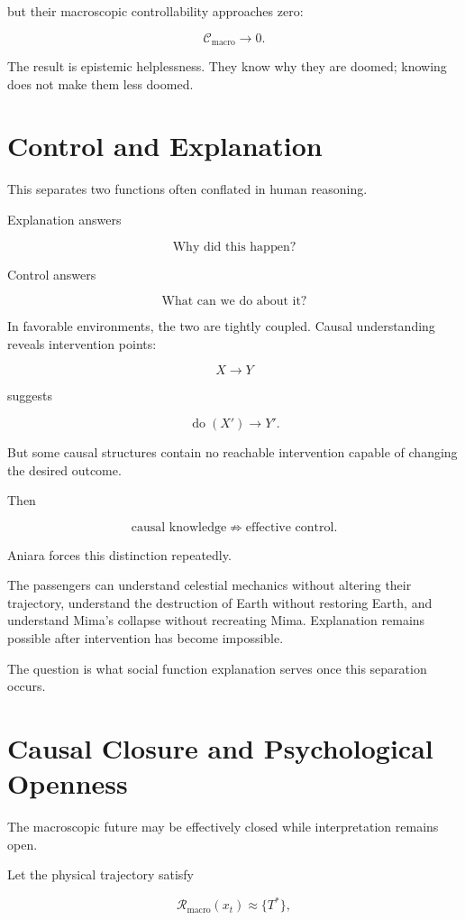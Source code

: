 \documentclass[11pt,oneside]{book}
\theoremstyle{definition}
\theoremstyle{remark}
\newcommand{\R}{\mathcal{R}}
\begin{document}
but their macroscopic controllability approaches zero:

\[
\mathcal C_{\mathrm{macro}}\rightarrow0.
\]

The result is epistemic helplessness. They know why they are doomed; knowing does not make them less doomed.

\section{Control and Explanation}

This separates two functions often conflated in human reasoning.

Explanation answers

\[
\text{Why did this happen?}
\]

Control answers

\[
\text{What can we do about it?}
\]

In favorable environments, the two are tightly coupled. Causal understanding reveals intervention points:

\[
X\rightarrow Y
\]

suggests

\[
\operatorname{do}(X')\rightarrow Y'.
\]

But some causal structures contain no reachable intervention capable of changing the desired outcome.

Then

\[
\text{causal knowledge}
\not\Rightarrow
\text{effective control}.
\]

Aniara forces this distinction repeatedly.

The passengers can understand celestial mechanics without altering their trajectory, understand the destruction of Earth without restoring Earth, and understand Mima's collapse without recreating Mima. Explanation remains possible after intervention has become impossible.

The question is what social function explanation serves once this separation occurs.

\section{Causal Closure and Psychological Openness}

The macroscopic future may be effectively closed while interpretation remains open.

Let the physical trajectory satisfy

\[
\R_{\mathrm{macro}}(x_t)
\approx
\{T^\ast\},
\]
\end{document}

